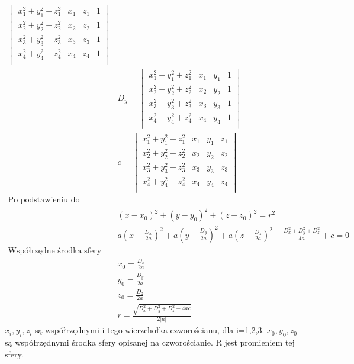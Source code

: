 \begin{equation}
\begin{aligned}
\begin{vmatrix}
                x_{1}^2+y_{1}^2+z_{1}^2 &x_{1}&z_{1}&1 \\
                x_{2}^2+y_{2}^2+z_{2}^2 &x_{2}&z_{2}&1 \\
                x_{3}^2+y_{3}^2+z_{3}^2 &x_{3}&z_{3}&1 \\
                x_{4}^2+y_{4}^2+z_{4}^2 &x_{4}&z_{4}&1 \\
            \end{vmatrix}\\
                &D_{y}=\begin{vmatrix}
                x_{1}^2+y_{1}^2+z_{1}^2 &x_{1}&y_{1}&1 \\
                x_{2}^2+y_{2}^2+z_{2}^2 &x_{2}&y_{2}&1 \\
                x_{3}^2+y_{3}^2+z_{3}^2 &x_{3}&y_{3}&1 \\
                x_{4}^2+y_{4}^2+z_{4}^2 &x_{4}&y_{4}&1 \\
            \end{vmatrix}\\
            &c=\begin{vmatrix}
                x_{1}^2+y_{1}^2+z_{1}^2 &x_{1}&y_{1}&z_{1} \\
                x_{2}^2+y_{2}^2+z_{2}^2 &x_{2}&y_{2}&z_{2} \\
                x_{3}^2+y_{3}^2+z_{3}^2 &x_{3}&y_{3}&z_{3} \\
                x_{4}^2+y_{4}^2+z_{4}^2 &x_{4}&y_{4}&z_{4} \\
            \end{vmatrix}\\
            \text{Po podstawieniu do równania opisującego sferę}\\
            &(x-x_{0})^2+(y-y_{0})^2+(z-z_{0})^2=r^2\\
            &a(x-\frac{D_{x}}{2a})^2+a(y-\frac{D_{y}}{2a})^2+a(z-\frac{D_{z}}{2a})^2-\frac{D_{x}^2+D_{y}^2+D_{z}^2}{4a}+c=0\\
            \text{Współrzędne środka sfery}\\
            &x_{0}=\frac{D_{x}}{2a}\\
            &y_{0}=\frac{D_{y}}{2a}\\
            &z_{0}=\frac{D_{z}}{2a}\\
            &r=\frac{\sqrt{D_{x}^2+D_{y}^2+D_{z}^2-4ac}}{2|a|}
    \end{aligned}
\end{equation}
$x_{i},y_{i},z_{i}$ są współrzędnymi i-tego wierzchołka czworościanu, dla i=1,2,3. $x_{0},y_{0},z_{0}$ są współrzędnymi środka sfery opisanej na czworościanie. R jest promieniem tej sfery.
